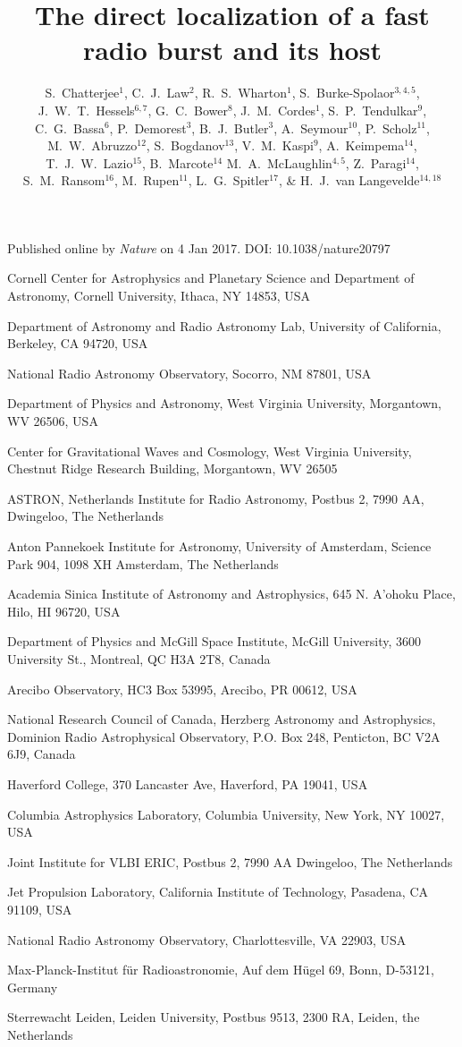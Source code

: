 \documentclass{nature_frb}
\title{The direct localization of a fast radio burst and its host}
\author{
S.~Chatterjee$^{1}$,
C.~J.~Law$^{2}$,
R.~S.~Wharton$^{1}$,
S.~Burke-Spolaor$^{3,4,5}$,
J.~W.~T.~Hessels$^{6,7}$,
G.~C.~Bower$^{8}$,
J.~M.~Cordes$^{1}$,
S.~P.~Tendulkar$^{9}$,
C.~G.~Bassa$^{6}$,
P.~Demorest$^{3}$,
B.~J.~Butler$^{3}$,
A.~Seymour$^{10}$,
P.~Scholz$^{11}$,
M.~W.~Abruzzo$^{12}$,
S.~Bogdanov$^{13}$,
V.~M.~Kaspi$^{9}$,
A.~Keimpema$^{14}$,
T.~J.~W.~Lazio$^{15}$,
B.~Marcote$^{14}$
M.~A.~McLaughlin$^{4,5}$,
Z.~Paragi$^{14}$,
S.~M.~Ransom$^{16}$,
M.~Rupen$^{11}$,
L.~G.~Spitler$^{17}$,
\&
H.~J.~van Langevelde$^{14,18}$
}
\begin{document}
\maketitle

\noindent Published online by \emph{Nature} on 4 Jan 2017.  DOI: 10.1038/nature20797

\begin{affiliations}
\item Cornell Center for Astrophysics and Planetary Science and Department of Astronomy, Cornell University, Ithaca, NY 14853, USA
\item Department of Astronomy and Radio Astronomy Lab, University of California, Berkeley, CA 94720, USA
\item National Radio Astronomy Observatory, Socorro, NM 87801, USA
\item Department of Physics and Astronomy, West Virginia University, Morgantown, WV 26506, USA
\item Center for Gravitational Waves and Cosmology, West Virginia University, Chestnut Ridge Research Building, Morgantown, WV 26505
\item ASTRON, Netherlands Institute for Radio Astronomy, Postbus 2, 7990 AA, Dwingeloo, The Netherlands
\item Anton Pannekoek Institute for Astronomy, University of
   Amsterdam, Science Park 904, 1098 XH Amsterdam, The Netherlands
\item Academia Sinica Institute of Astronomy and Astrophysics, 645 N. A'ohoku Place, Hilo, HI 96720, USA
\item Department of Physics and McGill Space Institute, McGill University, 3600 University St., Montreal, QC H3A 2T8, Canada
\item Arecibo Observatory, HC3 Box 53995, Arecibo, PR 00612, USA
\item National Research Council of Canada, Herzberg Astronomy and Astrophysics, Dominion Radio Astrophysical Observatory, P.O. Box 248, Penticton, BC V2A 6J9, Canada
\item Haverford College, 370 Lancaster Ave, Haverford, PA 19041, USA
\item Columbia Astrophysics Laboratory, Columbia University,  New York, NY 10027, USA
\item Joint Institute for VLBI ERIC, Postbus 2, 7990 AA Dwingeloo, The Netherlands
\item Jet Propulsion Laboratory, California Institute of Technology, Pasadena, CA 91109, USA
\item National Radio Astronomy Observatory, Charlottesville, VA 22903, USA
\item Max-Planck-Institut f\"ur Radioastronomie, Auf dem H\"ugel 69, Bonn, D-53121, Germany
\item Sterrewacht Leiden, Leiden University, Postbus 9513, 2300 RA, Leiden, the Netherlands
\end{affiliations}
\end{document}
